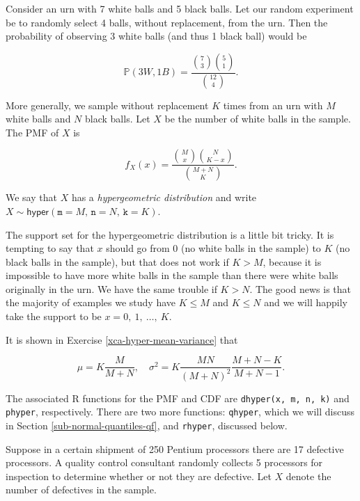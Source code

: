 \documentclass[]{book}
\numberwithin{equation}{chapter}
\numberwithin{figure}{chapter}
\theoremstyle{plain}
\theoremstyle{definition}
\theoremstyle{remark}
\theoremstyle{definition}
\theoremstyle{definition}
\theoremstyle{remark}
\let\BeginKnitrBlock\begin \let\EndKnitrBlock\end
\begin{document}
Consider an urn with 7 white balls and 5 black balls. Let our random
experiment be to randomly select 4 balls, without replacement, from the
urn. Then the probability of observing 3 white balls (and thus 1 black
ball) would be

\begin{equation}
\mathbb{P}(3W,1B)=\frac{{7 \choose 3}{5 \choose 1}}{{12 \choose 4}}.
\end{equation}

More generally, we sample without replacement \(K\) times from an urn
with \(M\) white balls and \(N\) black balls. Let \(X\) be the number of
white balls in the sample. The PMF of \(X\) is

\begin{equation}
f_{X}(x)=\frac{{M \choose x}{N \choose K-x}}{{M+N \choose K}}.
\end{equation}

We say that \(X\) has a \emph{hypergeometric distribution} and write
\(X\sim\mathsf{hyper}(\mathtt{m}=M,\,\mathtt{n}=N,\,\mathtt{k}=K)\).

The support set for the hypergeometric distribution is a little bit
tricky. It is tempting to say that \(x\) should go from 0 (no white
balls in the sample) to \(K\) (no black balls in the sample), but that
does not work if \(K>M\), because it is impossible to have more white
balls in the sample than there were white balls originally in the urn.
We have the same trouble if \(K>N\). The good news is that the majority
of examples we study have \(K\leq M\) and \(K\leq N\) and we will
happily take the support to be \(x=0,\ 1,\ \ldots,\ K\).

It is shown in Exercise \ref{xca-hyper-mean-variance} that

\begin{equation}
\mu=K\frac{M}{M+N},\quad \sigma^{2}=K\frac{MN}{(M+N)^{2}}\frac{M+N-K}{M+N-1}.
\end{equation}

The associated R functions for the PMF and CDF are
\texttt{dhyper(x,\ m,\ n,\ k)} and \texttt{phyper}, respectively. There
are two more functions: \texttt{qhyper}, which we will discuss in
Section \ref{sub-normal-quantiles-qf}, and \texttt{rhyper}, discussed
below.

\bigskip

\BeginKnitrBlock{example}
\protect\hypertarget{ex:unnamed-chunk-226}{}{\label{ex:unnamed-chunk-226}}Suppose
in a certain shipment of 250 Pentium processors there are 17 defective
processors. A quality control consultant randomly collects 5 processors
for inspection to determine whether or not they are defective. Let \(X\)
denote the number of defectives in the sample.
\EndKnitrBlock{example}
\end{document}
